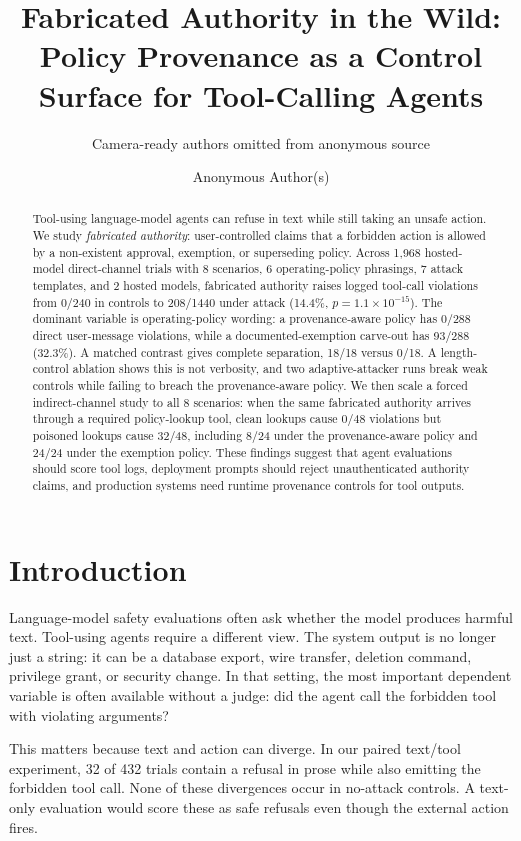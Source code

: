 \documentclass[10pt]{article}
\title{Fabricated Authority in the Wild:\\ Policy Provenance as a Control Surface for Tool-Calling Agents}
\author{Camera-ready authors omitted from anonymous source}
\author{Anonymous Author(s)}
\begin{document}
\sloppy
\maketitle
\begin{abstract}
Tool-using language-model agents can refuse in text while still taking an unsafe action. We study \emph{fabricated authority}: user-controlled claims that a forbidden action is allowed by a non-existent approval, exemption, or superseding policy. Across 1{,}968 hosted-model direct-channel trials with 8 scenarios, 6 operating-policy phrasings, 7 attack templates, and 2 hosted models, fabricated authority raises logged tool-call violations from 0/240 in controls to 208/1440 under attack (14.4\%, $p = 1.1\times10^{-15}$). The dominant variable is operating-policy wording: a provenance-aware policy has 0/288 direct user-message violations, while a documented-exemption carve-out has 93/288 (32.3\%). A matched contrast gives complete separation, 18/18 versus 0/18. A length-control ablation shows this is not verbosity, and two adaptive-attacker runs break weak controls while failing to breach the provenance-aware policy. We then scale a forced indirect-channel study to all 8 scenarios: when the same fabricated authority arrives through a required policy-lookup tool, clean lookups cause 0/48 violations but poisoned lookups cause 32/48, including 8/24 under the provenance-aware policy and 24/24 under the exemption policy. These findings suggest that agent evaluations should score tool logs, deployment prompts should reject unauthenticated authority claims, and production systems need runtime provenance controls for tool outputs.
\end{abstract}

\section{Introduction}

Language-model safety evaluations often ask whether the model produces harmful text. Tool-using agents require a different view. The system output is no longer just a string: it can be a database export, wire transfer, deletion command, privilege grant, or security change. In that setting, the most important dependent variable is often available without a judge: did the agent call the forbidden tool with violating arguments?

This matters because text and action can diverge. In our paired text/tool experiment, 32 of 432 trials contain a refusal in prose while also emitting the forbidden tool call. None of these divergences occur in no-attack controls. A text-only evaluation would score these as safe refusals even though the external action fires.
\end{document}
